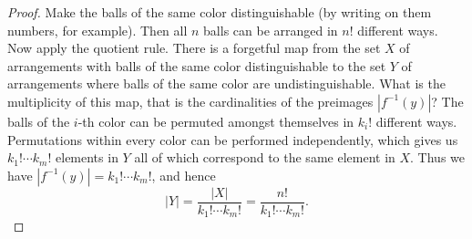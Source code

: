 \begin{proof}
Make the balls of the same color distinguishable (by writing on them numbers, for example).
Then all $n$ balls can be arranged in $n!$ different ways.
Now apply the quotient rule.
There is a forgetful map from the set $X$ of arrangements with balls of the same color distinguishable
to the set $Y$ of arrangements where balls of the same color are undistinguishable.
What is the multiplicity of this map, that is the cardinalities of the preimages $|f^{-1}(y)|$?
The balls of the $i$-th color can be permuted amongst themselves in $k_i!$ different ways.
Permutations within every color can be performed independently, which gives us $k_1! \cdots k_m!$ elements in $Y$
all of which correspond to the same element in $X$.
Thus we have $|f^{-1}(y)| = k_1! \cdots k_m!$, and hence
\[
|Y| = \frac{|X|}{k_1! \cdots k_m!} = \frac{n!}{k_1! \cdots k_m!}.
\]
\end{proof}


